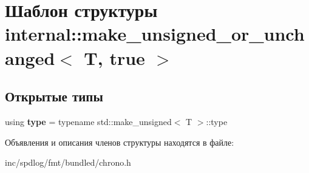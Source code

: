 \hypertarget{structinternal_1_1make__unsigned__or__unchanged_3_01T_00_01true_01_4}{}\section{Шаблон структуры internal\+:\+:make\+\_\+unsigned\+\_\+or\+\_\+unchanged$<$ T, true $>$}
\label{structinternal_1_1make__unsigned__or__unchanged_3_01T_00_01true_01_4}
\subsection*{Открытые типы}
\begin{DoxyCompactItemize}
\item 
\mbox{\label{structinternal_1_1make__unsigned__or__unchanged_3_01T_00_01true_01_4_aa379b4d3c9333a52a1794090508f5588}} 
using {\bfseries type} = typename std\+::make\+\_\+unsigned$<$ T $>$\+::type
\end{DoxyCompactItemize}


Объявления и описания членов структуры находятся в файле\+:\begin{DoxyCompactItemize}
\item 
inc/spdlog/fmt/bundled/chrono.\+h\end{DoxyCompactItemize}
